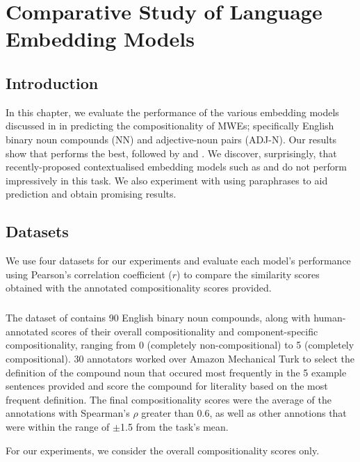 \chapter{Comparative Study of Language Embedding Models}
\section{Introduction}
In this chapter, we evaluate the performance of the various embedding models discussed in  in predicting the compositionality of MWEs; specifically English binary noun compounds (NN) and adjective-noun pairs (ADJ-N). Our results show that \wordtovec performs the best, followed by \fasttext and \infersent. We discover, surprisingly, that recently-proposed contextualised embedding models such as \bert and \elmo do not perform impressively in this task. We also experiment with using paraphrases to aid prediction and obtain promising results.

\section{Datasets}
\label{sec:datasets}
We use four datasets for our experiments and evaluate each model's performance using Pearson's correlation coefficient ($r$) to compare the similarity scores obtained with the annotated compositionality scores provided.

\paragraph{\reddy}
The dataset of \cite{Reddy2011} contains 90 English binary noun compounds, along with human-annotated scores of their overall compositionality and component-specific compositionality, ranging from 0 (completely non-compositional) to 5 (completely compositional). 30 annotators worked over Amazon Mechanical Turk to select the definition of the compound noun that occured most frequently in the 5 example sentences provided and score the compound for literality based on the most frequent deﬁnition. The final compositionality scores were the average of the annotations with Spearman's $\rho$ greater than 0.6, as well as other annotions that were within the range of $\pm$1.5 from the task's mean.

\noindent
For our experiments, we consider the overall compositionality scores only.

